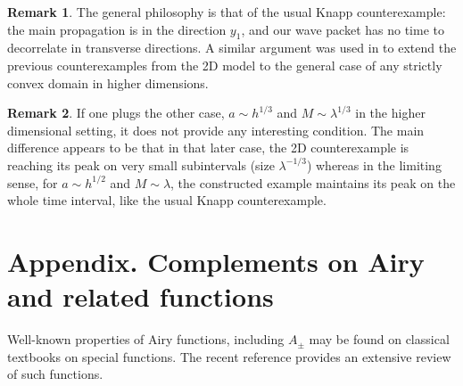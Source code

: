 \documentclass[JEP,XML,SOM,Unicode,NoEqCountersInSection,NoFloatCountersInSection,published]{cedram}
\theoremstyle{plain}
\theoremstyle{definition}
\newtheorem{rmq}{Remark}[section]
\begin{document}
\begin{rmq}
The general philosophy is that of the usual Knapp counterexample: the main propagation is in the direction $y_{1}$, and our wave packet has no time to decorrelate in transverse directions. A similar argument was used in \cite{doi2} to extend the previous counterexamples from the 2D model to the general case of any strictly convex domain in higher dimensions.
\end{rmq}
\begin{rmq}
If one plugs the other case, $a\sim h^{1/3}$ and $M\sim \lambda^{1/3}$ in the higher dimensional setting, it does not provide any interesting condition. The main difference appears to be that in that later case, the 2D counterexample is reaching its peak on very small subintervals (size $\lambda^{-1/3}$) whereas in the limiting sense, for $a\sim h^{1/2}$ and $M\sim \lambda$, the constructed example maintains its peak on the whole time interval, like the usual Knapp counterexample.
\end{rmq}

\appendix
{}
\section*{Appendix. Complements on Airy and related functions}
Well-known properties of Airy functions, including $A_{\pm}$ may be found on classical textbooks on special functions. The recent reference \cite{AFbook} provides an extensive review of such functions.
\end{document}
